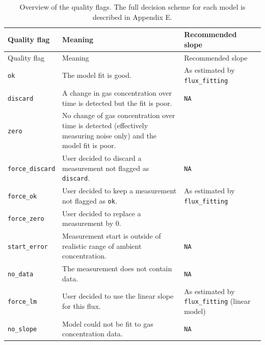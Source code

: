 \documentclass[
  letterpaper,
  DIV=11,
  numbers=noendperiod]{scrartcl}
\begin{document}
\begin{longtable}[]{@{}
  >{\raggedright\arraybackslash}p{}
  >{\raggedright\arraybackslash}p{}
  >{\raggedright\arraybackslash}p{}@{}}
\caption{\normalsize Overview of the quality flags. The full decision
scheme for each model is described in Appendix
E.}\label{tbl-flags}\tabularnewline
\toprule\noalign{}
\begin{minipage}[b]{\linewidth}\raggedright
Quality flag
\end{minipage} & \begin{minipage}[b]{\linewidth}\raggedright
Meaning
\end{minipage} & \begin{minipage}[b]{\linewidth}\raggedright
Recommended slope
\end{minipage} \\
\midrule\noalign{}
\endfirsthead
\toprule\noalign{}
\begin{minipage}[b]{\linewidth}\raggedright
Quality flag
\end{minipage} & \begin{minipage}[b]{\linewidth}\raggedright
Meaning
\end{minipage} & \begin{minipage}[b]{\linewidth}\raggedright
Recommended slope
\end{minipage} \\
\midrule\noalign{}
\endhead
\bottomrule\noalign{}
\endlastfoot
\texttt{ok} & The model fit is good. & As estimated by
\texttt{flux\_fitting} \\
\texttt{discard} & A change in gas concentration over time is detected
but the fit is poor. & \texttt{NA} \\
\texttt{zero} & No change of gas concentration over time is detected
(effectively measuring noise only) and the model fit is poor. & 0 \\
\texttt{force\_discard} & User decided to discard a measurement not
flagged as \texttt{discard}. & \texttt{NA} \\
\texttt{force\_ok} & User decided to keep a measurement not flagged as
\texttt{ok}. & As estimated by \texttt{flux\_fitting} \\
\texttt{force\_zero} & User decided to replace a measurement by 0. &
0 \\
\texttt{start\_error} & Measurement start is outside of realistic range
of ambient concentration. & \texttt{NA} \\
\texttt{no\_data} & The measurement does not contain data. &
\texttt{NA} \\
\texttt{force\_lm} & User decided to use the linear slope for this flux.
& As estimated by \texttt{flux\_fitting} (linear model) \\
\texttt{no\_slope} & Model could not be fit to gas concentration data. &
\texttt{NA} \\
\end{longtable}
\end{document}
